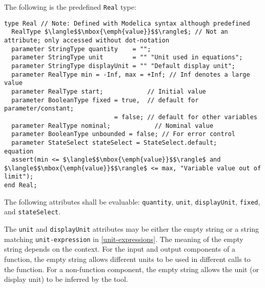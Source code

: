 The following is the predefined \lstinline!Real! type:
\begin{lstlisting}[language=modelica]
type Real // Note: Defined with Modelica syntax although predefined
  RealType $\langle$$\mbox{\emph{value}}$$\rangle$; // Not an attribute; only accessed without dot-notation
  parameter StringType quantity    = "";
  parameter StringType unit        = "" "Unit used in equations";
  parameter StringType displayUnit = "" "Default display unit";
  parameter RealType min = -Inf, max = +Inf; // Inf denotes a large value
  parameter RealType start;            // Initial value
  parameter BooleanType fixed = true,  // default for parameter/constant;
                              = false; // default for other variables
  parameter RealType nominal;            // Nominal value
  parameter BooleanType unbounded = false; // For error control
  parameter StateSelect stateSelect = StateSelect.default;
equation
  assert(min <= $\langle$$\mbox{\emph{value}}$$\rangle$ and $\langle$$\mbox{\emph{value}}$$\rangle$ <= max, "Variable value out of limit");
end Real;
\end{lstlisting}%
%
%
%
%
%
%
%
%
%

The following attributes shall be evaluable: \lstinline!quantity!, \lstinline!unit!, \lstinline!displayUnit!, \lstinline!fixed!, and \lstinline!stateSelect!.

The \lstinline!unit! and \lstinline!displayUnit! attributes may be either the empty string or a string matching \lstinline[language=grammar]!unit-expression! in \cref{unit-expressions}.
The meaning of the empty string depends on the context.
For the input and output components of a function, the empty string allows different units to be used in different calls to the function.
For a non-function component, the empty string allows the unit (or display unit) to be inferred by the tool.

